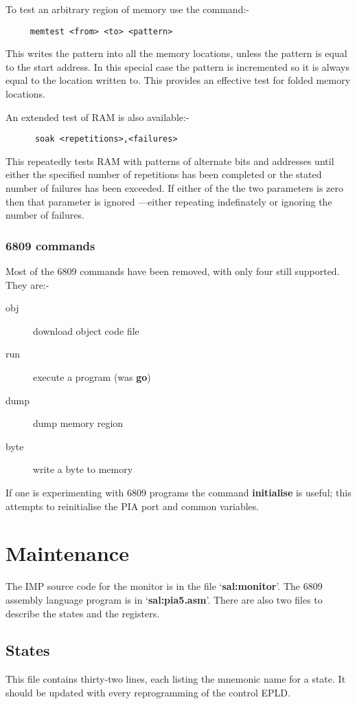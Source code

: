 To test an arbitrary region of memory use the command:-
\begin{verbatim}
     memtest <from> <to> <pattern>
\end{verbatim}
This writes the pattern into all the memory locations, unless the pattern is equal
to the start address.
In this special case the pattern is incremented so it is always equal to the location written to.
This provides an effective test for folded memory locations.

An extended test of RAM is also available:-
\begin{verbatim}
      soak <repetitions>,<failures>
\end{verbatim}
This repeatedly tests RAM with patterns of alternate bits and addresses until
either the specified number of repetitions has been completed or the stated number of failures has been exceeded.
If either of the the two parameters is zero then that parameter is ignored ---either repeating indefinately or ignoring the number of failures.

\subsubsection{6809 commands}
Most of the 6809 commands have been removed, with only four still supported.
They are:-
\begin{description}
	\item[obj] download object code file
	\item[run] execute a program (was {\bf go})
	\item[dump] dump memory region
	\item[byte] write a byte to memory
	\end{description}
If one is experimenting with 6809 programs the command {\bf initialise} is useful;
this attempts to reinitialise the PIA port and common variables.
	
\section{Maintenance}
The IMP source code for the monitor is in the file `{\bf sal:monitor}'.
The 6809 assembly language program is in `{\bf sal:pia5.asm}'.
There are also two files to describe the states and the registers.

\subsection{States}
This file contains thirty-two lines, each listing the mnemonic name for a state.
It should be updated with every reprogramming of the control EPLD.

